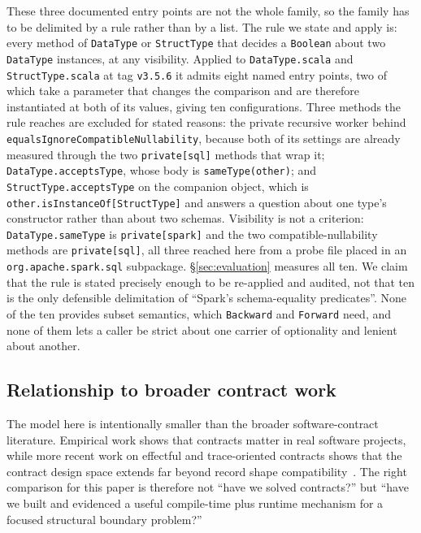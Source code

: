 These three documented entry points are not the whole family, so the family has to be delimited by a rule rather than by a list. The rule we state and apply is: every method of \texttt{DataType} or \texttt{StructType} that decides a \texttt{Boolean} about two \texttt{DataType} instances, at any visibility. Applied to \texttt{DataType.scala} and \texttt{StructType.scala} at tag \texttt{v3.5.6} it admits eight named entry points, two of which take a parameter that changes the comparison and are therefore instantiated at both of its values, giving ten configurations. Three methods the rule reaches are excluded for stated reasons: the private recursive worker behind \texttt{equals\allowbreak Ignore\allowbreak Compatible\allowbreak Nullability}, because both of its settings are already measured through the two \texttt{private[sql]} methods that wrap it; \texttt{DataType.acceptsType}, whose body is \texttt{sameType(other)}; and \texttt{StructType.acceptsType} on the companion object, which is \texttt{other.isInstanceOf[StructType]} and answers a question about one type's constructor rather than about two schemas. Visibility is not a criterion: \texttt{DataType.sameType} is \texttt{private[spark]} and the two compatible-nullability methods are \texttt{private[sql]}, all three reached here from a probe file placed in an \texttt{org.apache.spark.sql} subpackage. \S\ref{sec:evaluation} measures all ten. We claim that the rule is stated precisely enough to be re-applied and audited, not that ten is the only defensible delimitation of ``Spark's schema-equality predicates''. None of the ten provides subset semantics, which \texttt{Backward} and \texttt{Forward} need, and none of them lets a caller be strict about one carrier of optionality and lenient about another.

\subsection{Relationship to broader contract work}

The model here is intentionally smaller than the broader software-contract literature. Empirical work shows that contracts matter in real software projects, while more recent work on effectful and trace-oriented contracts shows that the contract design space extends far beyond record shape compatibility~\cite{contracts_in_practice,effectful_software_contracts,trace_contracts}. The right comparison for this paper is therefore not ``have we solved contracts?'' but ``have we built and evidenced a useful compile-time plus runtime mechanism for a focused structural boundary problem?''
